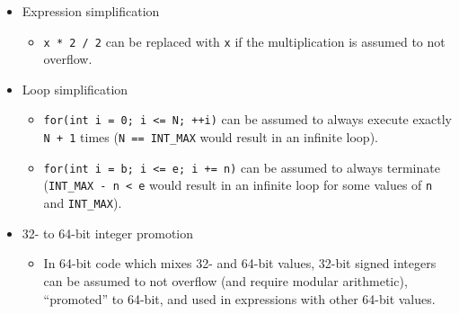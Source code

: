 \begin{itemize}
    \item Expression simplification
        \begin{itemize}
            \item
                \texttt{x * 2 / 2} can be replaced with \texttt{x} if the
                multiplication is assumed to not overflow.
        \end{itemize}
    \item Loop simplification
        \begin{itemize}
            \item
                \texttt{for(int i = 0; i <= N; ++i)} can be assumed to always
                execute exactly \texttt{N + 1} times (\texttt{N == INT\_MAX}
                would result in an infinite loop).
            \item
                \texttt{for(int i = b; i <= e; i += n)} can be assumed to always
                terminate (\texttt{INT\_MAX - n < e} would result in an infinite
                loop for some values of \texttt{n} and \texttt{INT\_MAX}).
        \end{itemize}
    \item 32- to 64-bit integer promotion
        \begin{itemize}
            \item
                In 64-bit code which mixes 32- and 64-bit values, 32-bit signed
                integers can be assumed to not overflow (and require modular
                arithmetic), ``promoted'' to 64-bit, and used in expressions
                with other 64-bit values\footnotemark.
        \end{itemize}
\end{itemize}
